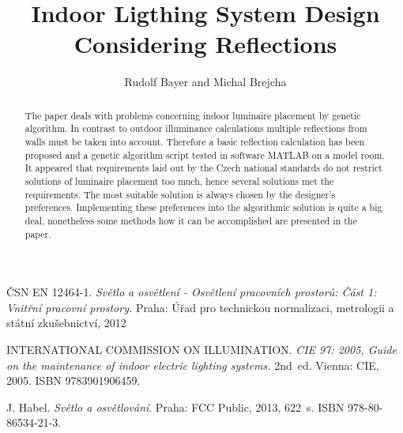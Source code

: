 \documentclass[Afour,sagev,times,doublespace]{sagej}
\begin{document}

\title{Indoor Ligthing System Design Considering Reflections}

\author{Rudolf Bayer and Michal Brejcha}




\begin{abstract}
The paper deals with problems concerning indoor luminaire placement by genetic algorithm. In contrast to outdoor illuminance calculations multiple reflections from walls must be taken into account. Therefore a basic reflection calculation has been proposed and a genetic algorithm script tested in software MATLAB on a model room. It appeared that requirements laid out by the Czech national standards do not restrict solutions of luminaire placement too much, hence several solutions met the requirements. The most suitable solution is always chosen by the designer's preferences. Implementing these preferences into the algorithmic solution is quite a big deal, nonetheless some methods how it can be accomplished are presented in the paper.
\end{abstract}


\maketitle









\begin{thebibliography}{99}

\v{C}SN EN 12464-1. \emph{Sv\v{e}tlo a osv\v{e}tlen\'{i} - Osv\v{e}tlen\'{i} pracovn\'{i}ch prostor\r{u}: \v{C}\'{a}st 1: Vnit\v{r}n\'{i} pracovn\'{i} prostory.} Praha: \'{U}\v{r}ad pro technickou normalizaci, metrologii a st\'{a}tn\'{i} zku\v{s}ebnictv\'{i}, 2012

INTERNATIONAL COMMISSION ON ILLUMINATION.\emph{ CIE 97: 2005, Guide on the maintenance of indoor electric lighting systems.} 2nd~ed. Vienna: CIE, 2005. ISBN 9783901906459.

J. Habel. \textit{Sv\v{e}tlo a osv\v{e}tlov\'{a}n\'{i}}. Praha: FCC Public, 2013, 622~s. ISBN 978-80-86534-21-3.

\end{thebibliography}
\end{document}
